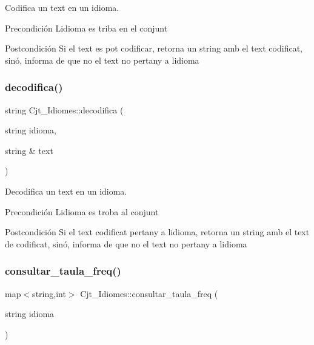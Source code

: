 Codifica un text en un idioma. 

\begin{DoxyPrecond}{Precondición}
L\textquotesingle{}idioma es triba en el conjunt 
\end{DoxyPrecond}
\begin{DoxyPostcond}{Postcondición}
Si el text es pot codificar, retorna un string amb el text codificat, sinó, informa de que no el text no pertany a l\textquotesingle{}idioma 
\end{DoxyPostcond}
\mbox{\label{class_cjt___idiomes_ab77062c4c2b311bbc1fc1143073bc036}} 
\subsubsection{\texorpdfstring{decodifica()}{decodifica()}}
{\footnotesize\ttfamily string Cjt\+\_\+\+Idiomes\+::decodifica (\begin{DoxyParamCaption}\item[{string}]{idioma,  }\item[{string \&}]{text }\end{DoxyParamCaption})}



Decodifica un text en un idioma. 

\begin{DoxyPrecond}{Precondición}
L\textquotesingle{}idioma es troba al conjunt 
\end{DoxyPrecond}
\begin{DoxyPostcond}{Postcondición}
Si el text codificat pertany a l\textquotesingle{}idioma, retorna un string amb el text de codificat, sinó, informa de que no el text no pertany a l\textquotesingle{}idioma 
\end{DoxyPostcond}
\mbox{\label{class_cjt___idiomes_a10390ac35850d05a28d06dbf6a3deb4f}} 
\subsubsection{\texorpdfstring{consultar\+\_\+taula\+\_\+freq()}{consultar\_taula\_freq()}}
{\footnotesize\ttfamily map$<$string,int$>$ Cjt\+\_\+\+Idiomes\+::consultar\+\_\+taula\+\_\+freq (\begin{DoxyParamCaption}\item[{string}]{idioma }\end{DoxyParamCaption})}



